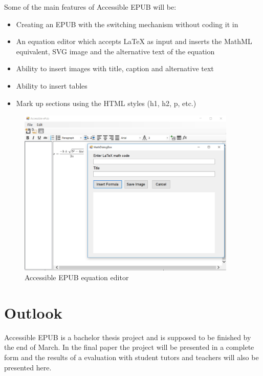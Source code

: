 \documentclass{llncs}
\begin{document}
Some of the main features of Accessible EPUB will be:

\begin{itemize}
	\item Creating an EPUB with the switching mechanism without coding it in
	\item An equation editor which accepts LaTeX as input and inserts the MathML equivalent, SVG image and the alternative text of the equation
	\item Ability to insert images with title, caption and alternative text
	\item Ability to insert tables
	\item Mark up sections using the HTML styles (h1, h2, p, etc.)
\end{itemize}



\begin{figure}
	\centering
	\includegraphics[height=80mm]{AccessibleEPUBequation.png}
	\caption{Accessible EPUB equation editor}
\end{figure}

\section{Outlook}
Accessible EPUB is a bachelor thesis project and is supposed to be finished by the end of March. In the final paper the project will be presented in a complete form and the results of a evaluation with student tutors and teachers will also be presented here. 



\end{document}
